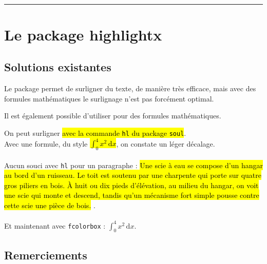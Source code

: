 \documentclass[french,11pt,a4paper]{article}
\begin{document}
\vfill~

\pagebreak


\hypertarget{matoc}{}

\tableofcontents

\vspace*{5mm}

\hrule

\vspace*{5mm}

\section{Le package highlightx}

\subsection{Solutions existantes}

Le package  permet de surligner du texte, de manière très efficace, mais avec des formules mathématiques le surlignage n'est pas forcément optimal.

Il est également possible d'utiliser  pour des formules mathématiques.

\begin{demohigh}[language=latex/latex2,style/main=cyan!10,style/code=cyan!10]
On peut surligner \hl{avec la commande \texttt{hl} du package \texttt{soul}}.\\
Avec une formule, du style \hl{$\int_0^4 x^2\,\text{d}x$}, on constate un léger décalage.\\\\
Aucun souci avec \texttt{hl} pour un paragraphe : \og \hl{Une scie à eau se compose d’un 
hangar au bord d’un ruisseau. Le toit est soutenu par une charpente qui porte sur quatre 
gros piliers en bois. À huit ou dix pieds d’élévation, au milieu du hangar, on voit une 
scie qui monte et descend, tandis qu’un mécanisme fort simple pousse contre cette scie 
une pièce de bois.} \fg.\\\\
Et maintenant avec \texttt{fcolorbox} : \colorbox{lightgray!25}{$\int_0^4 x^2\,\text{d}x$}.
\end{demohigh}

\subsection{Remerciements}
\end{document}
